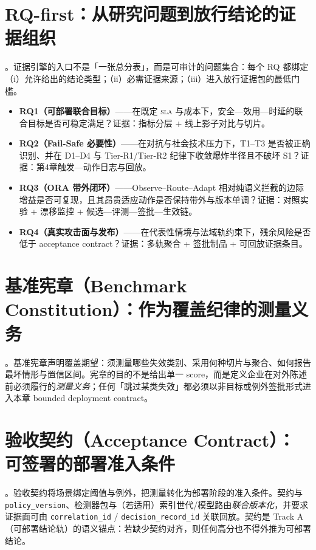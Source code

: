 \documentclass[11pt,a4paper]{report}
\begin{document}
\section{RQ-first：从研究问题到放行结论的证据组织}
\EvalFramework{}。证据引擎的入口不是「一张总分表」，而是可审计的问题集合：每个 RQ 都绑定（i）允许给出的结论类型；（ii）必需证据来源；（iii）进入放行证据包的最低门槛。
\begin{itemize}
  \item \textbf{RQ1（可部署联合目标）}——在既定 \textsc{sla} 与成本下，安全—效用—时延的联合目标是否可稳定满足？证据：指标分层 + 线上影子对比与切片。
  \item \textbf{RQ2（Fail-Safe 必要性）}——在对抗与社会技术压力下，T1--T3 是否被正确识别、并在 D1--D4 与 Tier-R1/Tier-R2 纪律下收敛爆炸半径且不破坏 S1？证据：第4章触发—动作日志与回放。
  \item \textbf{RQ3（ORA 带外闭环）}——Observe--Route--Adapt 相对纯语义拦截的边际增益是否可复现，且其昂贵适应动作是否保持带外与版本单调？证据：对照实验 + 漂移监控 + 候选—评测—签批—生效链。
  \item \textbf{RQ4（真实攻击面与发布）}——在代表性情境与法域轨约束下，残余风险是否低于 acceptance contract？证据：多轨聚合 + 签批制品 + 可回放证据条目。
\end{itemize}

\section{基准宪章（Benchmark Constitution）：作为覆盖纪律的测量义务}
\EvalFramework{}。基准宪章声明覆盖期望：须测量哪些失效类别、采用何种切片与聚合、如何报告最坏情形与置信区间。宪章的目的不是给出单一 score，而是定义企业在对外陈述前必须履行的\emph{测量义务}；任何「跳过某类失效」都必须以非目标或例外签批形式进入本章 bounded deployment contract。

\section{验收契约（Acceptance Contract）：可签署的部署准入条件}
\EvalFramework{}。验收契约将场景绑定阈值与例外，把测量转化为部署阶段的准入条件。契约与 \texttt{policy\_version}、检测器包与（若适用）索引世代/模型路由\emph{联合版本化}，并要求证据面可由 \texttt{correlation\_id} / \texttt{decision\_record\_id} 关联回放。契约是 Track A（可部署结论轨）的语义锚点：若缺少契约对齐，则任何高分也不得外推为可部署结论。
\end{document}
